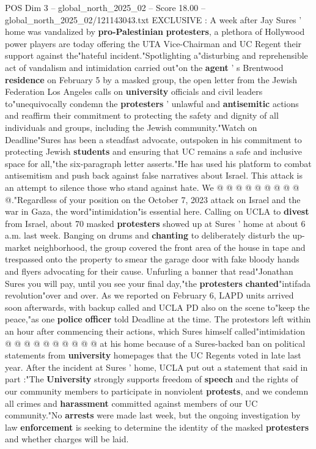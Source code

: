 \begin{textsample}{POS Dim 3 – global\_north\_2025\_02 – Score 18.00 – global\_north\_2025\_02/121143043.txt}  \label{ex:f3_pos_292}
EXCLUSIVE : A week after Jay Sures ' home was vandalized by \textbf{pro-Palestinian} \textbf{protesters}, a plethora of Hollywood power players are today offering the UTA Vice-Chairman and UC Regent their support against the"hateful incident."Spotlighting a"disturbing and reprehensible act of vandalism and intimidation carried out"on the \textbf{agent} ' s Brentwood \textbf{residence} on February 5 by a masked group, the open letter from the Jewish Federation Los Angeles calls on \textbf{university} officials and civil leaders to"unequivocally condemn the \textbf{protesters} ' unlawful and \textbf{antisemitic} actions and reaffirm their commitment to protecting the safety and dignity of all individuals and groups, including the Jewish community."Watch on Deadline"Sures has been a steadfast advocate, outspoken in his commitment to protecting Jewish \textbf{students} and ensuring that UC remains a safe and inclusive space for all,"the six-paragraph letter asserts."He has used his platform to combat antisemitism and push back against false narratives about Israel.
This attack is an attempt to silence those who stand against hate.
We @ @ @ @ @ @ @ @ @ @."Regardless of your position on the October 7, 2023 attack on Israel and the war in Gaza, the word"intimidation"is essential here.
Calling on UCLA to \textbf{divest} from Israel, about 70 masked \textbf{protesters} showed up at Sures ' home at about 6 a.m. last week.
Banging on drums and \textbf{chanting} to deliberately disturb the up-market neighborhood, the group covered the front area of the house in tape and trespassed onto the property to smear the garage door with fake bloody hands and flyers advocating for their cause.
Unfurling a banner that read"Jonathan Sures you will pay, until you see your final day,"the \textbf{protesters} \textbf{chanted}"intifada revolution"over and over.
As we reported on February 6, LAPD units arrived soon afterwards, with backup called and UCLA PD also on the scene to"keep the peace,"as one \textbf{police} \textbf{officer} told Deadline at the time.
The protestors left within an hour after commencing their actions, which Sures himself called"intimidation @ @ @ @ @ @ @ @ @ @ at his home because of a Sures-backed ban on political statements from \textbf{university} homepages that the UC Regents voted in late last year.
After the incident at Sures ' home, UCLA put out a statement that said in part :"The \textbf{University} strongly supports freedom of \textbf{speech} and the rights of our community members to participate in nonviolent \textbf{protests}, and we condemn all crimes and \textbf{harassment} committed against members of our UC community."No \textbf{arrests} were made last week, but the ongoing investigation by law \textbf{enforcement} is seeking to determine the identity of the masked \textbf{protesters} and whether charges will be laid.

\end{textsample}
